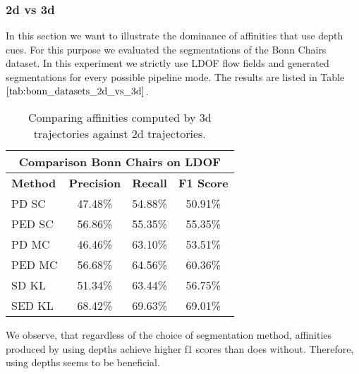 \subsubsection{2d vs 3d}
In this section we want to illustrate the dominance of affinities that use depth cues. For this purpose we evaluated the segmentations of the Bonn Chairs dataset. In this experiment we strictly use LDOF flow fields and generated segmentations for every possible pipeline mode. The results are listed in Table $\ref{tab:bonn_datasets_2d_vs_3d}$.
\begin{table}[H]
\centering
\begin{tabular}{|l|c|c|c|}
\hline
\multicolumn{4}{|c|}{Comparison Bonn Chairs on LDOF}                        \\ \hline
\textbf{Method} & \textbf{Precision} & \textbf{Recall} & \textbf{F1 Score}  \\ \hline
PD SC & 47.48\% & 54.88\% & 50.91\% \\ \hline
PED SC & 56.86\% & 55.35\% & 55.35\% \\ \hline
PD MC & 46.46\% & 63.10\% & 53.51\% \\ \hline
PED MC & 56.68\% & 64.56\% & 60.36\% \\ \hline              
SD KL & 51.34\% & 63.44\% & 56.75\% \\ \hline
SED KL & 68.42\% & 69.63\% & 69.01\% \\ \hline
\end{tabular}
\caption[2D vs. 3D: Bonn Datasets]{Comparing affinities computed by 3d trajectories against 2d trajectories.}
\label{tab:bonn_datasets_2d_vs_3d}
\end{table}
We observe, that regardless of the choice of segmentation method, affinities produced by using depths achieve higher f1 scores than does without. Therefore, using depths seems to be beneficial.

